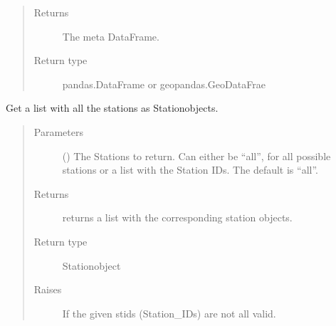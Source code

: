 \documentclass[letterpaper,10pt,english]{sphinxmanual}
\begin{document}
\begin{fulllineitems}
\begin{fulllineitems}
\begin{quote}
\begin{description}
\item[{Returns}] \leavevmode
\sphinxAtStartPar
The meta DataFrame.

\item[{Return type}] \leavevmode
\sphinxAtStartPar
pandas.DataFrame or geopandas.GeoDataFrae

\end{description}\end{quote}

\end{fulllineitems}


\begin{fulllineitems}
\label{\detokenize{weatherDB:weatherDB.stations.GroupStations.get_stations}}
\sphinxAtStartPar
Get a list with all the stations as Station\sphinxhyphen{}objects.
\begin{quote}\begin{description}
\item[{Parameters}] \leavevmode
\sphinxAtStartPar
{} (\sphinxstyleliteralemphasis{\sphinxupquote{, }}) \textendash{} The Stations to return.
Can either be “all”, for all possible stations
or a list with the Station IDs.
The default is “all”.

\item[{Returns}] \leavevmode
\sphinxAtStartPar
returns a list with the corresponding station objects.

\item[{Return type}] \leavevmode
\sphinxAtStartPar
Station\sphinxhyphen{}object

\item[{Raises}] \leavevmode
\sphinxAtStartPar
{} \textendash{} If the given stids (Station\_IDs) are not all valid.

\end{description}\end{quote}

\end{fulllineitems}


\end{fulllineitems}
\end{document}
